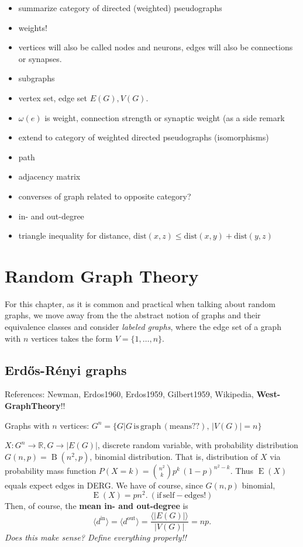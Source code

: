 \begin{itemize}
\item summarize category of directed (weighted) pseudographs
\item weights!
\item vertices will also be called nodes and neurons, edges will also be connections or synapses. 
\item subgraphs
\item vertex set, edge set $E(G), V(G)$.
\item $\omega(e)$ is weight, connection strength or synaptic weight (as a side remark
\item extend to category of weighted directed pseudographs (isomorphisms)
\item path
\item adjacency matrix
\item converses of graph related to opposite category?
\item in- and out-degree
\item triangle inequality for distance, $\mathrm{dist}(x,z) \leq  \mathrm{dist}(x,y) + \mathrm{dist}(y,z)$
\end{itemize}

\bigskip

\section{Random Graph Theory}

For this chapter, as it is common and practical when talking about random graphs, we move away from the the abstract notion of graphs and their equivalence classes and consider \textit{labeled graphs}, where the edge set of a graph with $n$ vertices takes the form $V = \{1,\ldots,n\}$.

\subsection{Erd\H{o}s-R\'{e}nyi graphs}

References: Newman, Erdos1960, Erdos1959, Gilbert1959, Wikipedia,\textbf{ West-GraphTheory}!! 		
		
		
\begin{defn}
Graphs with $n$ vertices: $G^n = \{G| G\,\mathrm{is\, graph\,(means??)},\, |V(G)| = n\}$
\end{defn}		
		
\begin{remark}
$X: G^n \to \mathbb{R}, G \to |E(G)|$, discrete random variable, with probability distribution  $G(n,p) =\operatorname{B}(n^2,p)$, binomial distribution. That is, distribution of $X$ via probability mass function $P(X=k) = {{n^2} \choose k} p^k\,(1-p)^{n^2-k}$. Thus $\operatorname{E}(X)$ equals expect edges in DERG. We have of course, since $G(n,p)$ binomial,
\[
\operatorname{E}(X) = pn^2. \mathrm{\:(if\,self-edges!)}
\]
Then, of course, the \textbf{mean in- and out-degree} is \[
\langle d^{\mathrm{in}} \rangle = \langle d^{\mathrm{out}} \rangle = \frac{\langle |E(G)| \rangle}{|V(G)|} = np.\]
\textit{Does this make sense? Define everything properly!!}
\end{remark} 		



